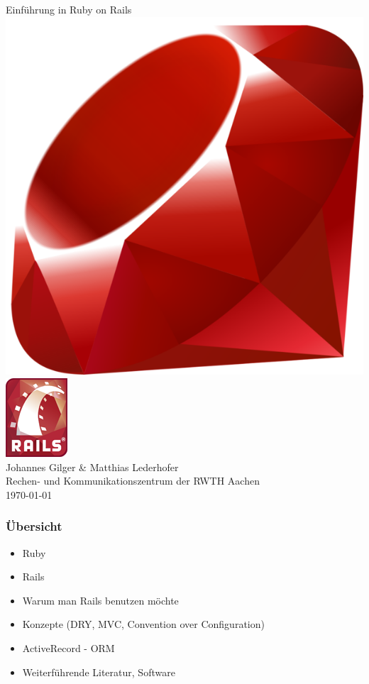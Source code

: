 \begin{frame}
  \begin{center}
    \vspace*{\fill}
    \Huge Einführung in Ruby on Rails \\
    \vspace{0.8cm}
    \includegraphics[scale=2]{img/ruby-logo.png} \enskip
    \includegraphics[scale=0.6]{img/rails-logo.png} \\
    \vspace{0.6cm}
    \Large Johannes Gilger \& Matthias Lederhofer \\
    \small Rechen- und Kommunikationszentrum der RWTH Aachen \\
    \vspace{1cm}
    \small \today
    \vspace*{\fill}
  \end{center}
\end{frame}

\begin{frame}
  \frametitle{Übersicht}
  \begin{itemize}
    \item Ruby
    \item Rails
    \item Warum man Rails benutzen möchte
    \item Konzepte (DRY, MVC, Convention over Configuration)
    \item ActiveRecord - ORM
    \item Weiterführende Literatur, Software
  \end{itemize}
\end{frame}


